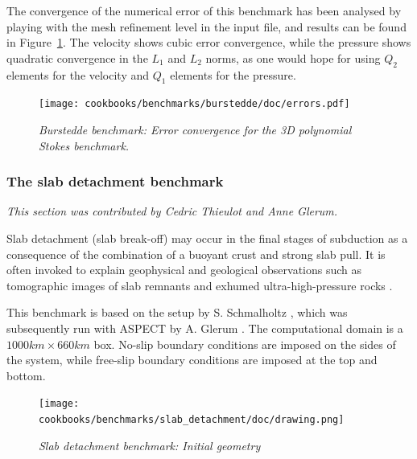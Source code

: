 \documentclass{article}
\newcommand{\aspect}{\textsc{ASPECT}}
\begin{document}
The convergence of the numerical error of this benchmark has been analysed by
playing with the mesh refinement level in the input file, and
results can be found in Figure~\ref{errors}. The velocity shows cubic error
convergence, while the pressure shows quadratic convergence in the $L_1$ and
$L_2$ norms, as one would hope for using $Q_2$ elements for the velocity and
$Q_1$ elements for the pressure.

\begin{figure}[tbp]
  \centering
  \texttt{[image: cookbooks/benchmarks/burstedde/doc/errors.pdf]}
  \caption{\it Burstedde benchmark: Error convergence for the 3D polynomial Stokes
    benchmark.
    \label{errors}}
\end{figure}

\subsubsection{The slab detachment benchmark}
\label{sec:benchmark_slab_detachment}

\textit{This section was contributed by Cedric Thieulot and Anne Glerum.}

Slab detachment (slab break-off) may occur in the final stages of subduction
as a consequence of the combination of a buoyant crust and strong slab pull.
It is often invoked to explain
geophysical and geological observations such as
tomographic images of slab remnants and
exhumed ultra-high-pressure rocks \cite{wosp00,vaal11,garm18}.

This benchmark is based on the setup by S. Schmalholtz \cite{schm11}, which was subsequently
run with \aspect{} by A. Glerum \cite{gltf18}.
The computational domain is a $1000 \si{km}\times 660 \si{km}$ box.
No-slip boundary conditions are imposed on the sides of the system, while free-slip
boundary conditions are imposed at the top and bottom.

\begin{figure}
\centering
\texttt{[image: cookbooks/benchmarks/slab\_detachment/doc/drawing.png]}
\caption{\it Slab detachment benchmark: Initial geometry
\label{fig:slab_detachment_setup}}
\end{figure}
\end{document}
